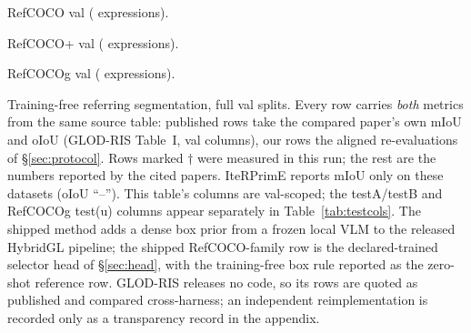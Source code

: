 \begin{table}[t]\centering\small
\caption{RefCOCO val ( expressions).}\label{tab:main_refcoco}

\end{table}
\begin{table}[t]\centering\small
\caption{RefCOCO+ val ( expressions).}\label{tab:main_refcocoplus}

\end{table}
\begin{table}[t]\centering\small
\caption{RefCOCOg val ( expressions).}\label{tab:main_refcocog}

\end{table}

\begin{table}[t]\centering\small
\caption{Training-free referring segmentation, full val splits. Every row
carries \emph{both} metrics from the same source table: published rows take
the compared paper's own mIoU and oIoU (GLOD-RIS Table~I, val columns), our
rows the aligned re-evaluations of \S\ref{sec:protocol}. Rows marked
$\dagger$ were measured in this run; the rest are the numbers reported by the
cited papers. IteRPrimE reports mIoU only on these datasets (oIoU ``--'').
This table's columns are val-scoped; the testA/testB and RefCOCOg test(u)
columns appear separately in Table~\ref{tab:testcols}. The shipped method adds
a dense box prior from a frozen local VLM to the released HybridGL pipeline;
the shipped RefCOCO-family row is the declared-trained selector head of
\S\ref{sec:head}, with the training-free box rule reported as the zero-shot
reference row. GLOD-RIS releases no code, so its rows are quoted as published
and compared cross-harness; an independent reimplementation is recorded only
as a transparency record in the appendix.}
\label{tab:sota}

\end{table}


